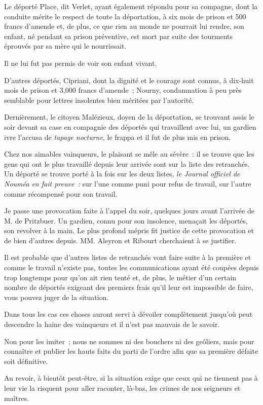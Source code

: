 \documentclass[french,twoside]{book} %
\newcommand{\signed}[1]{\bigbreak\filbreak{\raggedleft #1\par}\medskip}
\newenvironment{quoteblock}%
  {\begin{quoting}}
  {\end{quoting}}
\newenvironment{quotebar}{%
    \def\FrameCommand{{\color{rubric!10!}\vrule width 0.5em} \hspace{0.9em}}%
    \def\OuterFrameSep{\itemsep} %
    \MakeFramed {\advance\hsize-\width \FrameRestore}
  }%
  {%
    \endMakeFramed
  }
\renewenvironment{quoteblock}%
  {%
    \savenotes
    \setstretch{0.9}
    \normalfont
    \begin{quotebar}
  }
  {%
    \end{quotebar}
    \spewnotes
  }
\begin{document}
\begin{quoteblock}
   Le déporté Place, dit Verlet, ayant également répondu pour sa compagne, dont la conduite mérite le respect de toute la déportation, à six mois de prison et 500 francs d’amende et, de plus, ce que rien au monde ne pourrait lui rendre, son enfant, né pendant sa prison préventive, est mort par suite des tourments éprouvés par sa mère qui le nourrissait.\par
 Il ne lui fut pas permis de voir son enfant vivant.\par
 D’autres déportés, Cipriani, dont la dignité et le courage sont connus, à dix-huit mois de prison et 3,000 francs d’amende ; Nourny, condamnation à peu près semblable pour lettres insolentes bien méritées par l’autorité.\par
 Dernièrement, le citoyen Malézieux, doyen de la déportation, se trouvant assis le soir devant sa case en compagnie des déportés qui travaillent avec lui, un gardien ivre l’accusa de \emph{tapage nocturne}, le frappa et il fut de plus mis en prison.\par
 Chez nos aimables vainqueurs, le plaisant se mêle au sévère : il se trouve que les gens qui ont le plus travaillé depuis leur arrivée sont sur la liste des retranchés. Un déporté se trouve porté à la fois sur les deux listes, \emph{le Journal officiel de Nouméa en fait preuve :} sur l’une comme puni pour refus de travail, sur l’autre comme récompensé pour son travail.\par
 Je passe une provocation faite à l’appel du soir, quelques jours avant l’arrivée de M. de Pritzbuer. Un gardien, connu pour son insolence, menaçait les déportés, son revolver à la main. Le plus profond mépris fit justice de cette provocation et de bien d’autres depuis. MM. Aleyron et Ribourt cherchaient à se justifier.\par
 Il est probable que d’autres listes de retranchés vont faire suite à la première et comme le travail n’existe pas, toutes les communications ayant été coupées depuis trop longtemps pour qu’on ait rien tenté et, de plus, le métier d’un certain nombre de déportés exigeant des premiers  frais qu’il leur est impossible de faire, vous pouvez juger de la situation.\par
 Dans tous les cas ces choses auront servi à dévoiler complètement jusqu’où peut descendre la haine des vainqueurs et il n’est pas mauvais de le savoir.\par
 Non pour les imiter ; nous ne sommes ni des bouchers ni des geôliers, mais pour connaître et publier les hauts faits du parti de l’ordre afin que sa première défaite soit définitive.\par
 Au revoir, à bientôt peut-être, si la situation exige que ceux qui ne tiennent pas à leur vie la risquent pour aller raconter, là-bas, les crimes de nos seigneurs et maîtres.\par
 

\signed{L{\scshape ouise} M{\scshape ichel}, n\textsuperscript{o} 1.}
 \end{quoteblock}
\end{document}
